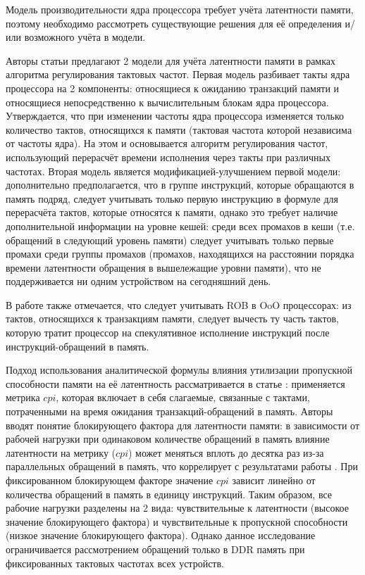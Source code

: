     Модель производительности ядра процессора требует учёта латентности памяти, поэтому
    необходимо рассмотреть существующие решения для её определения и/или возможного учёта в модели.

    Авторы статьи \cite{keramidas2010interval} предлагают 2 модели для учёта латентности памяти
    в рамках алгоритма регулирования тактовых частот. Первая модель разбивает такты ядра процессора
    на 2 компоненты: относящиеся к ожиданию транзакций памяти и относящиеся непосредственно к вычислительным
    блокам ядра процессора. Утверждается, что при изменении частоты ядра процессора изменяется только
    количество тактов, относящихся к памяти (тактовая частота которой независима от частоты ядра).
    На этом и основывается алгоритм регулирования частот, использующий перерасчёт времени
    исполнения через такты при различных частотах. Вторая модель является модификацией-улучшением
    первой модели: дополнительно предполагается, что в группе инструкций, которые обращаются в
    память подряд, следует учитывать только первую инструкцию в формуле для перерасчёта тактов,
    которые относятся к памяти, однако это требует наличие дополнительной информации на уровне кешей:
    среди всех промахов в кеши (т.е. обращений в следующий уровень памяти) следует учитывать только
    первые промахи среди группы промахов (промахов, находящихся на расстоянии порядка времени
    латентности обращения в вышележащие уровни памяти), что не поддерживается ни одним устройством
    на сегодняшний день.

    В работе также отмечается, что следует учитывать ROB в OoO процессорах: из тактов, относящихся к
    транзакциям памяти, следует вычесть ту часть тактов, которую тратит процессор на спекулятивное
    исполнение инструкций после инструкций-обращений в память.

    Подход использования аналитической формулы влияния утилизации пропускной способности памяти на
    её латентность рассматривается в статье \cite{clapp2015quantifying}: применяется
    метрика $cpi$, которая включает в себя слагаемые, связанные с тактами, потраченными
    на время ожидания транзакций-обращений в память. Авторы вводят понятие блокирующего фактора
    для латентности памяти: в зависимости от рабочей нагрузки при одинаковом количестве обращений в память
    влияние латентности на метрику ($cpi$) может меняться вплоть до десятка раз из-за параллельных
    обращений в память, что коррелирует с результатами работы \cite{keramidas2010interval}.
    При фиксированном блокирующем факторе значение $cpi$ зависит линейно от количества обращений
    в память в единицу инструкций.
    Таким образом, все рабочие нагрузки разделены на 2 вида: чувствительные к латентности (высокое
    значение блокирующего фактора) и чувствительные к пропускной способности (низкое значение
    блокирующего фактора).
    Однако данное исследование ограничивается рассмотрением обращений только в DDR память
    при фиксированных тактовых частотах всех устройств.

